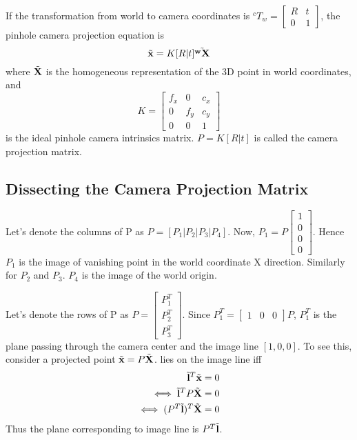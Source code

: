 If the transformation from world to camera coordinates is $^cT_w = \begin{bmatrix}R & t \\0 & 1 \end{bmatrix}$, the pinhole camera projection equation is
\begin{equation}
\tilde{\mathbf{x}} = K [R | t] \tilde{\mathbf{^wX}}
\end{equation}
where $\tilde{\mathbf{X}}$ is the homogeneous representation of the 3D point in world coordinates, and
\begin{equation}
K = \begin{bmatrix}
f_x & 0   & c_x\\
0   & f_y & c_y\\
0   & 0   & 1
\end{bmatrix}
\end{equation}
is the ideal pinhole camera intrinsics matrix. $P = K[R | t]$ is called the camera projection matrix.

\subsection{Dissecting the Camera Projection Matrix}
Let's denote the columns of P as $P = [P_1 | P_2 | P_3 | P_4]$. Now, $P_1 = P \begin{bmatrix}1\\0\\0\\0\end{bmatrix}$. Hence $P_1$ is the image of vanishing point in the world
coordinate X direction. Similarly for $P_2$ and $P_3$. $P_4$ is the image of the world origin.

Let's denote the rows of P as $P = \begin{bmatrix}P_1^T\\P_2^T\\P_3^T\end{bmatrix}$. Since $P_1^T = \begin{bmatrix}1 & 0 & 0\end{bmatrix}P$, $P_1^T$ is the plane passing 
through the camera center and the image line $[1, 0, 0]$. To see this, consider a projected point $\tilde{\mathbf{x}} = P \tilde{\mathbf{X}}$.  lies on the image line  iff
\begin{align}
\tilde{\mathbf{l}}^T\tilde{\mathbf{x}} &= 0\\
\iff \tilde{\mathbf{l}}^TP\tilde{\mathbf{X}} &= 0\\
\iff (P^T\tilde{\mathbf{l}})^T\tilde{\mathbf{X}} &= 0
\end{align}
Thus the plane corresponding to image line  is $P^T\tilde{\mathbf{l}}$.

